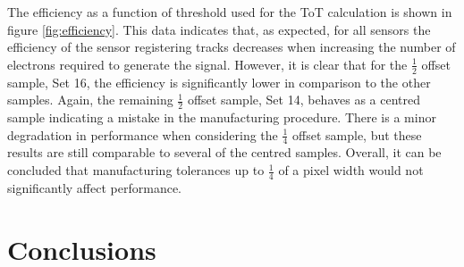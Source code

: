The efficiency as a function of threshold used for the ToT calculation is shown in figure \ref{fig:efficiency}.  This data indicates that, as expected, for all sensors the efficiency of the sensor registering tracks decreases when increasing the number of electrons required to generate the signal.  However, it is clear that for the $\frac{1}{2}$ offset sample, Set 16, the efficiency is significantly lower in comparison to the other samples.  Again, the remaining $\frac{1}{2}$ offset sample, Set 14, behaves as a centred sample indicating a mistake in the manufacturing procedure.  There is a minor degradation in performance when considering the $\frac{1}{4}$ offset sample, but these results are still comparable to several of the centred samples.  Overall, it can be concluded that manufacturing tolerances up to $\frac{1}{4}$ of a pixel width would not significantly affect performance.    


\section{Conclusions}



  
